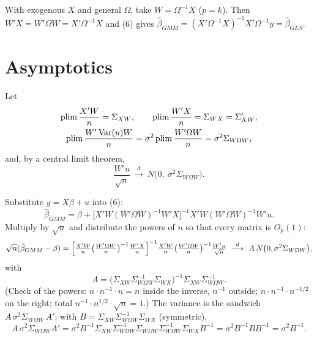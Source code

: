 \documentclass[11pt]{article}
\begin{document}
With exogenous $X$ and general $\Omega$, take $W=\Omega^{-1}X$ ($p=k$). Then $W'X=W'\Omega W=X'\Omega^{-1}X$ and (6)
gives $\hat\beta_{GMM}=(X'\Omega^{-1}X)^{-1}X'\Omega^{-1}y=\hat\beta_{GLS}$.

\section{Asymptotics}

Let
\begin{gather*}
 \operatorname{plim}\frac{X'W}{n}=\Sigma_{XW},\qquad
 \operatorname{plim}\frac{W'X}{n}=\Sigma_{WX}=\Sigma_{XW}',\\
 \operatorname{plim}\frac{W'\operatorname{Var}(u)W}{n}=\sigma^{2}\operatorname{plim}\frac{W'\Omega W}{n}=\sigma^{2}\Sigma_{W\Omega W},
\end{gather*}
and, by a central limit theorem,
\[ \frac{W'u}{\sqrt n}\ \overset{d}{\longrightarrow}\ N\bigl(0,\ \sigma^{2}\Sigma_{W\Omega W}\bigr). \]

Substitute $y=X\beta+u$ into (6):
\[ \hat\beta_{GMM}=\beta+\bigl[X'W(W'\Omega W)^{-1}W'X\bigr]^{-1}X'W(W'\Omega W)^{-1}W'u . \]
Multiply by $\sqrt n$ and distribute the powers of $n$ so that every matrix is $O_{p}(1)$:
\[ \sqrt n(\hat\beta_{GMM}-\beta)
 =\Bigl[\tfrac{X'W}{n}\bigl(\tfrac{W'\Omega W}{n}\bigr)^{-1}\tfrac{W'X}{n}\Bigr]^{-1}
  \tfrac{X'W}{n}\bigl(\tfrac{W'\Omega W}{n}\bigr)^{-1}\tfrac{W'u}{\sqrt n}
 \ \overset{d}{\longrightarrow}\ A\,N\bigl(0,\sigma^{2}\Sigma_{W\Omega W}\bigr), \]
with
\[ A=\bigl(\Sigma_{XW}\Sigma_{W\Omega W}^{-1}\Sigma_{WX}\bigr)^{-1}\Sigma_{XW}\Sigma_{W\Omega W}^{-1}. \]
(Check of the powers: $n\cdot n^{-1}\cdot n=n$ inside the inverse, $n^{-1}$ outside; $n\cdot n^{-1}\cdot n^{-1/2}$ on the
right; total $n^{-1}\cdot n^{1/2}\cdot\sqrt n=1$.) The variance is the sandwich
$A\,\sigma^{2}\Sigma_{W\Omega W}\,A'$; with $B=\Sigma_{XW}\Sigma_{W\Omega W}^{-1}\Sigma_{WX}$ (symmetric),
\[ A\,\sigma^{2}\Sigma_{W\Omega W}A'
 =\sigma^{2}B^{-1}\Sigma_{XW}\Sigma_{W\Omega W}^{-1}\Sigma_{W\Omega W}\Sigma_{W\Omega W}^{-1}\Sigma_{WX}B^{-1}
 =\sigma^{2}B^{-1}BB^{-1}=\sigma^{2}B^{-1}. \]
\end{document}
